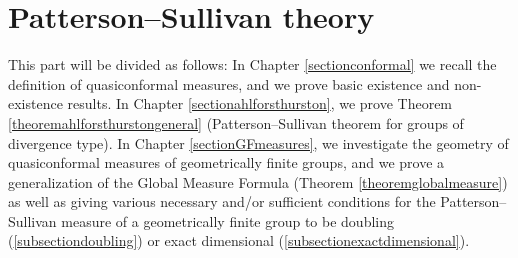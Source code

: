 \part{Patterson--Sullivan theory}
\label{partahlforsthurston}
This part will be divided as follows: In Chapter \ref{sectionconformal} we recall the definition of quasiconformal measures, and we prove basic existence and non-existence results. In Chapter \ref{sectionahlforsthurston}, we prove Theorem \ref{theoremahlforsthurstongeneral} (Patterson--Sullivan theorem for groups of divergence type). In Chapter \ref{sectionGFmeasures}, we investigate the geometry of quasiconformal measures of geometrically finite groups, and we prove a generalization of the Global Measure Formula (Theorem \ref{theoremglobalmeasure}) as well as giving various necessary and/or sufficient conditions for the Patterson--Sullivan measure of a geometrically finite group to be doubling (\6\ref{subsectiondoubling}) or exact dimensional (\6\ref{subsectionexactdimensional}).

